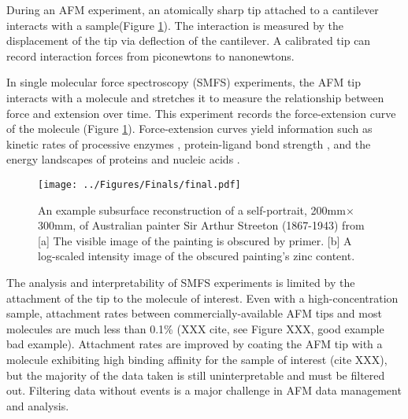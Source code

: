\documentclass[%
  aip,12pt,tightenlines,
  amsthm,
 amsmath,amssymb
]{article}
\newcommand{\fRef}[1]{Figure \ref{figure:#1}}
\newcommand{\fLabel}[1]{\label{figure:#1}}
\newcommand{\pcaption}[1]{\caption{\noindent#1}}
\newcommand{\pl}[0]{\vspace{6pt}}
\newcommand{\pEndF}[0]{ \\ }
\newcommand{\pStartF}[0]{ }
\newcommand{\singlemol}[0]{SMFS}
\newcommand{\citePRH}[1]{\cite{#1}}
\begin{document}
During an AFM experiment, an atomically sharp tip attached to a cantilever interacts with a sample(\fRef{Cartoon}). The interaction is measured by the displacement of the tip via deflection of the cantilever. A calibrated tip can record interaction forces from piconewtons to nanonewtons. \pl

In single molecular force spectroscopy (\singlemol{}) experiments, the AFM tip interacts with a molecule and stretches it to measure the relationship between force and extension over time. This experiment records the force-extension curve of the molecule (\fRef{Cartoon}). Force-extension curves yield information such as kinetic rates of processive enzymes \citePRH{comstock_direct_2015}, protein-ligand bond strength \citePRH{yuan_energy_2000}, and the energy landscapes of proteins and nucleic acids \citePRH{dudko_Theory_2008}. \pl

\begin{figure}
\centering
\texttt{[image: ../Figures/Finals/final.pdf]}%
\pcaption{\noindent\fLabel{Cartoon}\pStartF An example subsurface reconstruction of a self-portrait, 200mm$\times$300mm, of Australian painter Sir Arthur Streeton (1867-1943) from \citet{howard_high-definition_2012} [a] The visible image of the painting is obscured by primer. [b] A log-scaled intensity image of the obscured painting's zinc content. \pEndF }
\end{figure}


The analysis and interpretability of \singlemol{} experiments is limited by the attachment of the tip to the molecule of interest. Even with a high-concentration sample, attachment rates between commercially-available AFM tips and most molecules are much less than 0.1\% (XXX cite, see Figure XXX, good example bad example). Attachment rates are improved by coating the AFM tip with a molecule exhibiting high binding affinity for the sample of interest (cite XXX), but the majority of the data taken is still uninterpretable and must be filtered out. Filtering data without events is a major challenge in AFM data management and analysis.\pl
\end{document}
